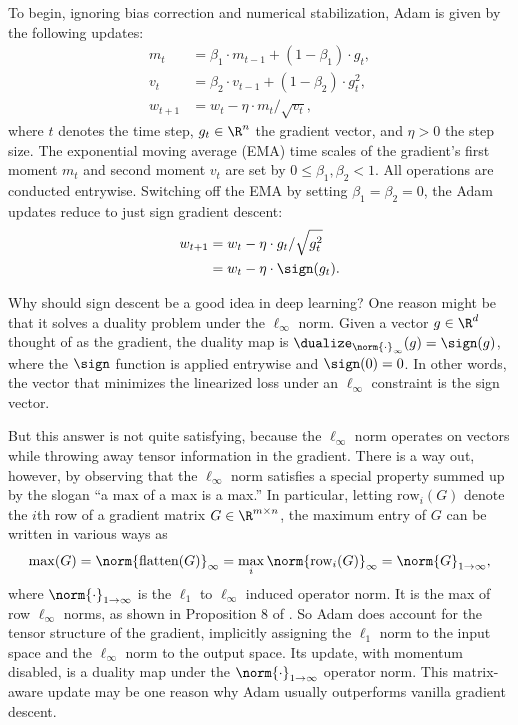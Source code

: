 To begin, ignoring bias correction and numerical stabilization, Adam is given by the following updates:
\begin{align}
    m_t &= \beta_1 \cdot m_{t-1} + (1 - \beta_1) \cdot g_t, \\
    v_t &= \beta_2 \cdot v_{t-1} + (1 - \beta_2) \cdot g_t^2, \\
    w_{t+1} &= w_t - \eta \cdot m_t / \sqrt{v_t},
\end{align}
where $t$ denotes the time step, $g_t \in \R^n$ the gradient vector, and $\eta > 0$ the step size. The exponential moving average (EMA) time scales of the gradient's first moment $m_t$ and second moment $v_t$ are set by $0 \leq \beta_1, \beta_2 < 1$. All operations are conducted entrywise. Switching off the EMA by setting $\beta_1 = \beta_2 = 0$, the Adam updates reduce to just sign gradient descent:
\begin{align}
    w_{t+1} &= w_t - \eta \cdot g_t / \sqrt{g_t^{2}} \label{eq:funky-adam} \\
    &= w_t - \eta \cdot \sign(g_t) \label{eq:sign-adam}.
\end{align}

Why should sign descent be a good idea in deep learning? One reason might be that it solves a duality problem under the $\ell_\infty$ norm. Given a vector $g \in \R^d$ thought of as the gradient, the duality map is $\dualize_{\norm{\cdot}_\infty}(g) = \sign(g)$, where the $\sign$ function is applied entrywise and $\sign(0) = 0$. In other words, the vector that minimizes the linearized loss under an $\ell_\infty$ constraint is the sign vector.

But this answer is not quite satisfying, because the $\ell_\infty$ norm operates on vectors while throwing away tensor information in the gradient. There is a way out, however, by observing that the $\ell_\infty$ norm satisfies a special property summed up by the slogan ``a max of a max is a max.'' In particular, letting $\text{row}_i(G)$ denote the $i$th row of a gradient matrix $G \in \R^{m \times n}$, the maximum entry of $G$ can be written in various ways as \begin{equation}
    \max(G) = \norm{\text{flatten}(G)}_\infty = \max_i \norm{\text{row}_i(G)}_\infty = \norm{G}_{1 \to \infty},
\end{equation} where $\norm{\cdot}_{1 \to \infty}$ is the $\ell_1$ to $\ell_\infty$ induced operator norm. It is the max of row $\ell_\infty$ norms, as shown in Proposition 8 of \citet{bernstein2024anthology}. So Adam does account for the tensor structure of the gradient, implicitly assigning the $\ell_1$ norm to the input space and the $\ell_\infty$ norm to the output space. Its update, with momentum disabled, is a duality map under the $\norm{\cdot}_{1\to\infty}$ operator norm. This matrix-aware update may be one reason why Adam usually outperforms vanilla gradient descent.

